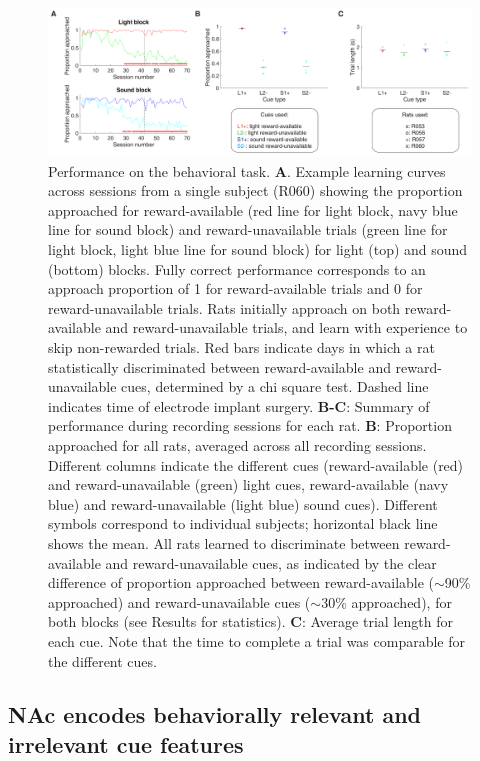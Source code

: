 \documentclass[11pt]{article}
\newcommand{\bsf}[1]{\textbf{#1}}
\begin{document}
 \begin{figure}[ht!]
\centering
\includegraphics[width=\textwidth]{Fig 3 - Behavioral results.pdf}
\caption{Performance on the behavioral task. \bsf{A}. Example learning
  curves across sessions from a single subject (R060) showing the
  proportion approached for reward-available (red line for light
  block, navy blue line for sound block) and reward-unavailable trials
  (green line for light block, light blue line for sound block) for
  light (top) and sound (bottom) blocks. Fully correct performance
  corresponds to an approach proportion of 1 for reward-available
  trials and 0 for reward-unavailable trials. Rats initially approach
  on both reward-available and reward-unavailable trials, and learn
  with experience to skip non-rewarded trials. Red bars indicate days
  in which a rat statistically discriminated between reward-available
  and reward-unavailable cues, determined by a chi square test. Dashed
  line indicates time of electrode implant surgery. \bsf{B-C}: Summary
  of performance during recording sessions for each rat. \bsf{B}:
  Proportion approached for all rats, averaged across all recording
  sessions. Different columns indicate the different cues
  (reward-available (red) and reward-unavailable (green) light cues,
  reward-available (navy blue) and reward-unavailable (light blue)
  sound cues). Different symbols correspond to individual subjects;
  horizontal black line shows the mean. All rats learned to
  discriminate between reward-available and reward-unavailable cues,
  as indicated by the clear difference of proportion approached
  between reward-available ($\sim$90\% approached) and
  reward-unavailable cues ($\sim$30\% approached), for both blocks
  (see Results for statistics). \bsf{C}: Average trial length for each
  cue. Note that the time to complete a trial was comparable for the
  different cues.}
\label{fig:behav}
\end{figure} \clearpage

\subsection*{NAc encodes behaviorally relevant and irrelevant cue features}
\end{document}
